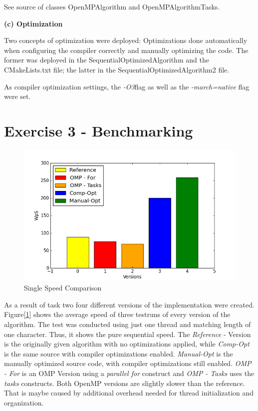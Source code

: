 \documentclass[a4paper,twoside,11pt]{article}
\begin{document}
See source of classes OpenMPAlgorithm and OpenMPAlgorithmTasks.

\textbf{(c) Optimization}

Two concepts of optimization were deployed: Optimizations done automatically when configuring the compiler correctly and manually optimizing the code. The former was deployed in the  SequentialOptimizedAlgorithm and the CMakeLists.txt file; the latter in the SequentialOptimizedAlgorithm2 file.

As compiler optimization settings, the \textit{-O3}flag as well as the \textit{-march=native} flag were set.

\section{Exercise 3 - Benchmarking}

\begin{figure}[hbtp]
\caption{Single Speed Comparison}
\centering
\label{fig:seq_comp}
\includegraphics[scale=0.8]{seq.png}
\end{figure}

As a result of task two four different versions of the implementation were created. 
Figure[\ref{fig:seq_comp}] shows the average speed of three testruns of every version of the algorithm. The test was conducted using just one thread and matching length of one character. Thus, it shows the pure sequential speed.
The \textit{Reference} - Version is the originally given  algorithm with no optimizations applied, while \textit{Comp-Opt} is the same source with compiler optimizations enabled. \textit{Manual-Opt} is the manually optimized source code, with compiler optimizations still enabled.
\textit{OMP - For } is an OMP Version using a \textit{parallel for} construct and \textit{OMP - Tasks} uses the \textit{tasks} constructs.
Both OpenMP versions are slightly slower than the reference. That is maybe caused by additional overhead needed for thread initialization and  organization.
\end{document}
